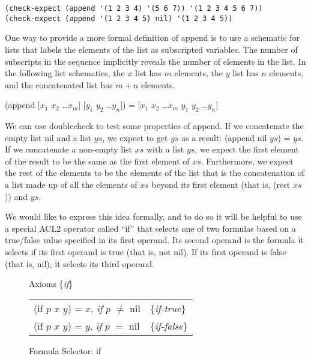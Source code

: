 \begin{Verbatim}
(check-expect (append '(1 2 3 4) '(5 6 7)) '(1 2 3 4 5 6 7))
(check-expect (append '(1 2 3 4 5) nil) '(1 2 3 4 5))
\end{Verbatim}

One way to provide a more formal definition of append is
to use a schematic for lists
that labels the elements of the list as subscripted variables.
The number of subscripts in the sequence implicitly reveals the number of elements in the list.
\label{list-schematic} In the following list schematics,
the $x$ list has $m$ elements, the $y$ list has $n$ elements,
and the concatenated list has $m+n$ elements.
\begin{samepage}
\begin{center}
(append [$x_1$ $x_2$ \dots $x_m$] [$y_1$ $y_2$ \dots $y_n$]) = [$x_1$ $x_2$ \dots $x_m$ $y_1$ $y_2$ \dots $y_n$]
\end{center}
\end{samepage}

We can use doublecheck to test some properties of append.
If we concatenate the empty list nil and a list $ys$,
we expect to get $ys$ as a result: (append nil $ys$) = $ys$.
If we concatenate a non-empty list $xs$ with a list $ys$,
we expect the first element of the result to be the same as
the first element of $xs$.
Furthermore, we expect the rest of the elements to be
the elements of the list that is the concatenation of
a list made up of all the elements of $xs$ beyond its first element
(that is, (rest $xs$)) and $ys$.

We would like to express this idea formally,
and to do so it will be helpful to use a special ACL2 operator
called ``if''
that selects one of two formulas based on a true/false
value specified in its first operand.
Its second operand is the formula it selects if
its first operand is true (that is, not nil).
If its first operand is false (that is, nil),
it selects its third operand.

\begin{figure}
\begin{center}
Axioms \{\emph{if}\} \\
\begin{tabular}{ll}
(if $p$ $x$ $y$) = $x$, \emph{if} $p$ $\neq$ nil  & \{\emph{if-true}\}  \\
(if $p$ $x$ $y$) = $y$, \emph{if} $p$ $=$ nil     & \{\emph{if-false}\} \\
\end{tabular}
\end{center}
\caption{Formula Selector: if}
\label{fig:if-axioms}
\end{figure}

